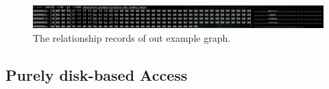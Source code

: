 \documentclass[a4paper,10pt]{article}
\begin{document}
    \begin{figure}[htp]\label{property_keys}
        \begin{center}
            \includegraphics[keepaspectratio,height=1.2\textheight,width=1.2\textwidth]{img/04_example/property_key_strings.png}
        \end{center}
        \caption{The relationship records of out example graph.} %
    \end{figure}
    
    \subsection{Purely disk-based Access}
\end{document}
